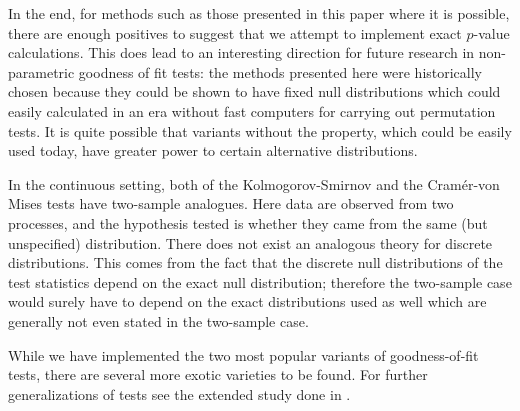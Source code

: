 In the end, for methods such as those presented in this paper where it is possible,
there are enough positives to suggest that we attempt to implement exact $p$-value calculations. This does lead
to an interesting direction for future research in non-parametric goodness of fit tests: the methods presented
here were historically chosen because they could be shown to have fixed null distributions which could easily
calculated in an era without fast computers for carrying out permutation tests. It is quite possible that
variants without the property, which could be easily used today, have greater power to certain alternative 
distributions.


In the continuous setting, both of 
the Kolmogorov-Smirnov and the Cram\'{e}r-von Mises tests have two-sample analogues. Here data are
observed from two processes, and the hypothesis tested is 
whether they came from the same (but unspecified) distribution. There
does not exist an analogous theory for discrete distributions. 
This comes from the fact that the discrete null distributions
of the test statistics depend on the exact null distribution; 
therefore the two-sample case would surely have to depend
on the exact distributions used as well %
which are generally not even stated in the two-sample case. 

While we have implemented the two most popular variants of 
goodness-of-fit tests, there are 
several more exotic varieties to be found. For further 
generalizations of tests see the extended study done in \cite{dewev1973}.


%



\address{Taylor B. Arnold \\
Yale University\\
24 Hillhouse Ave. \\
New Haven, CT 06511
USA\\
}

\address{John W. Emerson \\
Yale University\\
24 Hillhouse Ave. \\
New Haven, CT 06511
USA\\
}

